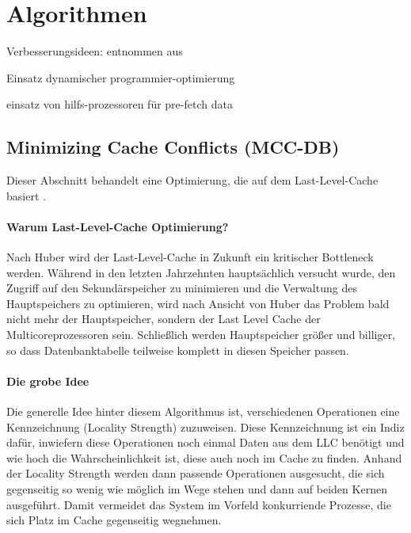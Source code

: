 \chapter{Algorithmen}
\label{sec:Algorithmen}

Verbesserungsideen: entnommen aus \cite{SALOMIE}

Einsatz dynamischer programmier-optimierung

einsatz von hilfs-prozessoren für pre-fetch data

\section{Minimizing Cache Conflicts (MCC-DB)}
\label{sec:MCC-DB}
Dieser Abschnitt behandelt eine Optimierung, die auf dem Last-Level-Cache basiert \cite{LEE}. 

\subsubsection*{Warum Last-Level-Cache Optimierung?}
Nach Huber \cite{HUBER} wird der Last-Level-Cache in Zukunft ein kritischer Bottleneck werden. Während in den letzten Jahrzehnten hauptsächlich versucht wurde, den Zugriff auf den Sekundärspeicher zu minimieren und die Verwaltung des Hauptspeichers zu optimieren, wird nach Ansicht von Huber das Problem bald nicht mehr der Hauptspeicher, sondern der Last Level Cache der Multicoreprozessoren sein. Schließlich werden Hauptspeicher größer und billiger, so dass Datenbanktabelle teilweise komplett in diesen Speicher passen.

\subsubsection*{Die grobe Idee}
Die generelle Idee hinter diesem Algorithmus ist, verschiedenen Operationen eine Kennzeichnung (Locality Strength) zuzuweisen. Diese Kennzeichnung ist ein Indiz dafür, inwiefern diese Operationen noch einmal Daten aus dem LLC benötigt und wie hoch die Wahrscheinlichkeit ist, diese auch noch im Cache zu finden. Anhand der Locality Strength werden dann passende Operationen ausgesucht, die sich gegenseitig so wenig wie möglich im Wege stehen und dann auf beiden Kernen ausgeführt. Damit vermeidet das System im Vorfeld konkurriende Prozesse, die sich Platz im Cache gegenseitig wegnehmen.

